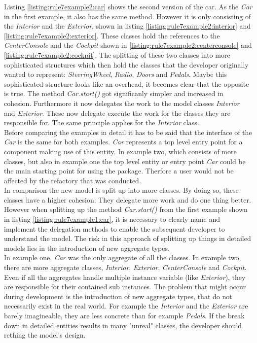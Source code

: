 Listing \ref{listing:rule7example2:car} shows the second version of the car. As the \textit{Car} in the first example, it also has the same method. However it is only consisting of the \textit{Interior} and the \textit{Exterior}, shown in listing \ref{listing:rule7example2:interior} and \ref{listing:rule7example2:exterior}. These classes hold the references to the \textit{CenterConsole} and the \textit{Cockpit} shown in \ref{listing:rule7example2:centerconsole} and \ref{listing:rule7example2:cockpit}. The splitting of these two classes into more sophisticated structures which then hold the classes that the developer originally wanted to represent: \textit{SteeringWheel}, \textit{Radio}, \textit{Doors} and \textit{Pedals}. Maybe this sophisticated structure looks like an overhead,  it becomes clear that the opposite is true. The method \textit{Car.start()} got significanly simpler and increased in cohesion. Furthermore it now delegates the work to the model classes \textit{Interior} and \textit{Exterior}. These now delegate execute the work for the classes they are responsible for. The same principle applies for the \textit{Interior} class. 
\\

Before comparing the examples in detail it has to be said that the interface of the \textit{Car} is the same for both examples. \textit{Car} represents a top level entry point for a component making use of this entity. In example two, which consists of more classes, but also in example one the top level entity or entry point \textit{Car} could be the main starting point for using the package. Therfore a user would not be affected by the refactory that was conducted. 
\\

In comparison the new model is split up into more classes. By doing so, these classes have a higher cohesion: They delegate more work and do one thing better. However when splitting up the method \textit{Car.start()} from the first example shown in listing \ref{listing:rule7example1:car}, it is necessary to clearly name and implement the delegation methods to enable the subsequent developer to understand the model. The risk in this approach of splitting up things in detailed models lies in the introduction of new aggregate types. 
\\

In example one, \textit{Car} was the only aggregate of all the classes. In example two, there are more aggregate classes, \textit{Interior}, \textit{Exterior}, \textit{CenterConsole} and \textit{Cockpit}. Even if all the aggregates handle multiple instance variable (like \textit{Exterior}), they are responsible for their contained sub instances. The problem that might occur during development is the introduction of new aggregate types, that do not necessarily exist in the real world. For example the \textit{Interior} and the \textit{Exterior} are barely imagineable, they are less concrete than for example \textit{Pedals}. If the break down in detailed entities results in many "unreal" classes, the developer should rething the model's design. 
\\

